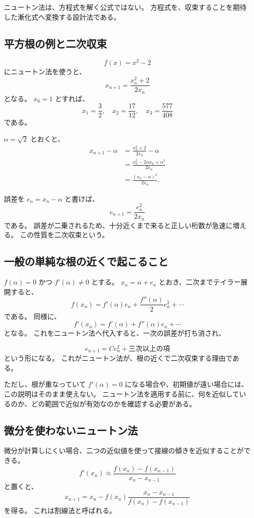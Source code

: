 ニュートン法は、方程式を解く公式ではない。
方程式を、収束することを期待した漸化式へ変換する設計法である。

\subsection{平方根の例と二次収束}

\[
  f(x)=x^2-2
\]
にニュートン法を使うと、
\[
  x_{n+1}=\frac{x_n^2+2}{2x_n}
\]
となる。
$x_0=1$ とすれば、
\[
  x_1=\frac32,\quad
  x_2=\frac{17}{12},\quad
  x_3=\frac{577}{408}
\]
である。

$\alpha=\sqrt2$ とおくと、
\[
\begin{aligned}
  x_{n+1}-\alpha
  &=\frac{x_n^2+2}{2x_n}-\alpha\\
  &=\frac{x_n^2-2\alpha x_n+\alpha^2}{2x_n}\\
  &=\frac{(x_n-\alpha)^2}{2x_n}.
\end{aligned}
\]

誤差を $e_n=x_n-\alpha$ と書けば、
\[
  e_{n+1}=\frac{e_n^2}{2x_n}
\]
である。
誤差が二乗されるため、十分近くまで来ると正しい桁数が急速に増える。
この性質を二次収束という。

\subsection{一般の単純な根の近くで起こること}

$f(\alpha)=0$ かつ $f'(\alpha)\neq0$ とする。
$x_n=\alpha+e_n$ とおき、二次までテイラー展開すると、
\[
  f(x_n)=f'(\alpha)e_n+\frac{f''(\alpha)}2e_n^2+\cdots
\]
である。
同様に、
\[
  f'(x_n)=f'(\alpha)+f''(\alpha)e_n+\cdots
\]
となる。
これをニュートン法へ代入すると、一次の誤差が打ち消され、

\[
  e_{n+1}=C e_n^2+\text{三次以上の項}
\]
という形になる。
これがニュートン法が、根の近くで二次収束する理由である。

ただし、根が重なっていて $f'(\alpha)=0$ になる場合や、初期値が遠い場合には、この説明はそのまま使えない。
ニュートン法を適用する前に、何を近似しているのか、どの範囲で近似が有効なのかを確認する必要がある。

\subsection{微分を使わないニュートン法}

微分が計算しにくい場合、二つの近似値を使って接線の傾きを近似することができる。
\[
  f'(x_n)\approx
  \frac{f(x_n)-f(x_{n-1})}{x_n-x_{n-1}}
\]
と置くと、
\[
  x_{n+1}
  =
  x_n
  -
  f(x_n)
  \frac{x_n-x_{n-1}}{f(x_n)-f(x_{n-1})}
\]
を得る。
これは割線法と呼ばれる。

